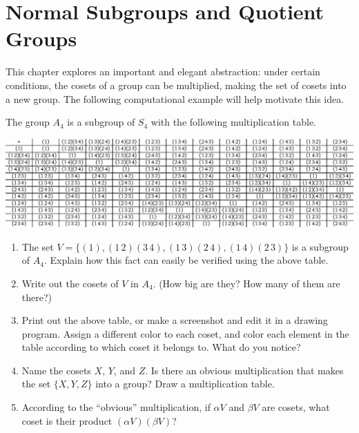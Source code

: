 \chapter{Normal Subgroups and Quotient Groups}

This chapter explores an important and elegant abstraction: under certain conditions, the cosets of a group can be multiplied, making the set of cosets into a new group. The following computational example will help motivate this idea.
\begin{annotation}
\end{annotation}

\begin{problem}\label{prob:a4comp}
The group \(A_4\)  is a subgroup of \(S_4\) with the following multiplication table.
\begin{center}
\includegraphics[width=\textwidth]{a4.eps}
\end{center}
\begin{enumerate}
  \item The set \(V=\{(1),(1\,2)(3\,4), (1\,3)(2\,4) , (1\,4)(2\,3)\} \) is a subgroup of \(A_4\). Explain how this fact can easily be verified using the above table.
  \item Write out the cosets of \(V\) in \(A_4\). (How big are they? How many of them are there?)
  \item Print out the above table, or make a screenshot and edit it in a drawing program. Assign a different color to each coset, and color each element in the table according to which coset it belongs to. What do you notice?
  \item Name the cosets \(X\), \(Y\), and \(Z\). Is there an obvious multiplication that makes the set \(\{X,Y,Z\}\) into a group? Draw a multiplication table.
  \item According to the ``obvious'' multiplication, if \(\alpha V\) and \(\beta V\) are cosets, what coset is their product \((\alpha V)(\beta V)\)?
\end{enumerate}
\end{problem}

